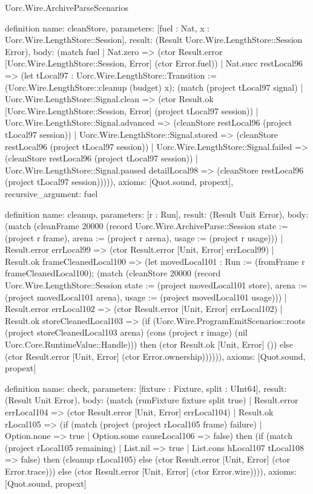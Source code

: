 \begin{lexlean}{Uorc.Wire.ArchiveParseScenarios}
\begin{semanticmodule}
definition{
  name: cleanStore,
  parameters: [fuel : Nat, x : Uorc.Wire.LengthStore::Session],
  result: (Result Uorc.Wire.LengthStore::Session Error),
  body: (match fuel
    | Nat.zero => (ctor Result.error [Uorc.Wire.LengthStore::Session, Error] (ctor Error.fuel))
    | Nat.succ restLocal96 => (let tLocal97 : Uorc.Wire.LengthStore::Transition := (Uorc.Wire.LengthStore::cleanup (budget) x); (match (project tLocal97 signal)
      | Uorc.Wire.LengthStore::Signal.clean => (ctor Result.ok [Uorc.Wire.LengthStore::Session, Error] (project tLocal97 session))
      | Uorc.Wire.LengthStore::Signal.advanced => (cleanStore restLocal96 (project tLocal97 session))
      | Uorc.Wire.LengthStore::Signal.stored => (cleanStore restLocal96 (project tLocal97 session))
      | Uorc.Wire.LengthStore::Signal.failed => (cleanStore restLocal96 (project tLocal97 session))
      | Uorc.Wire.LengthStore::Signal.paused detailLocal98 => (cleanStore restLocal96 (project tLocal97 session))))),
  axioms: [Quot.sound, propext],
  recursive_argument: fuel
}

definition{
  name: cleanup,
  parameters: [r : Run],
  result: (Result Unit Error),
  body: (match (cleanFrame 20000 (record Uorc.Wire.ArchiveParse::Session {state := (project r frame), arena := (project r arena), usage := (project r usage)}))
    | Result.error errLocal99 => (ctor Result.error [Unit, Error] errLocal99)
    | Result.ok frameCleanedLocal100 => (let movedLocal101 : Run := (fromFrame r frameCleanedLocal100); (match (cleanStore 20000 (record Uorc.Wire.LengthStore::Session {state := (project movedLocal101 store), arena := (project movedLocal101 arena), usage := (project movedLocal101 usage)}))
      | Result.error errLocal102 => (ctor Result.error [Unit, Error] errLocal102)
      | Result.ok storeCleanedLocal103 => (if (Uorc.Wire.ProgramEmitScenarios::roots (project storeCleanedLocal103 arena) (cons (project r image) (nil Uorc.Core.RuntimeValue::Handle))) then (ctor Result.ok [Unit, Error] ()) else (ctor Result.error [Unit, Error] (ctor Error.ownership)))))),
  axioms: [Quot.sound, propext]
}

definition{
  name: check,
  parameters: [fixture : Fixture, split : UInt64],
  result: (Result Unit Error),
  body: (match (runFixture fixture split true)
    | Result.error errLocal104 => (ctor Result.error [Unit, Error] errLocal104)
    | Result.ok rLocal105 => (if (match (project (project rLocal105 frame) failure)
      | Option.none => true
      | Option.some causeLocal106 => false) then (if (match (project rLocal105 remaining)
      | List.nil => true
      | List.cons hLocal107 tLocal108 => false) then (cleanup rLocal105) else (ctor Result.error [Unit, Error] (ctor Error.trace))) else (ctor Result.error [Unit, Error] (ctor Error.wire)))),
  axioms: [Quot.sound, propext]
}


\end{semanticmodule}
\end{lexlean}
